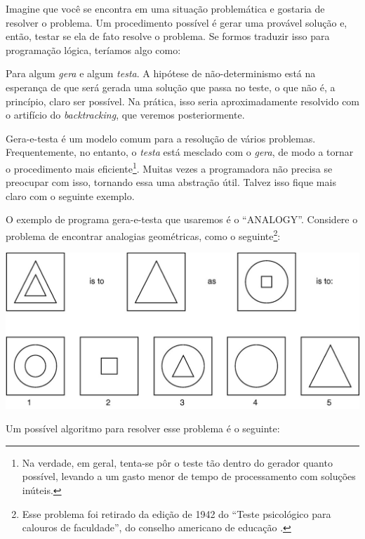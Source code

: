 \documentclass{article}
\theoremstyle{remark}
\theoremstyle{theorem}
\begin{document}
  Imagine que você se encontra em uma situação problemática e gostaria de resolver o problema. Um procedimento possível é gerar uma provável solução e, então, testar se ela de fato resolve o problema. Se formos traduzir isso para programação lógica, teríamos algo como:



Para algum \textit{gera} e algum \textit{testa}. A hipótese de não-determinismo está na esperança de que será gerada uma solução que passa no teste, o que não é, a princípio, claro ser possível. Na prática, isso seria aproximadamente resolvido com o artifício do \textit{backtracking}, que veremos posteriormente.

Gera-e-testa é um modelo comum para a resolução de vários problemas. Frequentemente, no entanto, o \textit{testa} está mesclado com o \textit{gera}, de modo a tornar o procedimento mais eficiente\footnote{Na verdade, em geral, tenta-se pôr o teste tão dentro do gerador quanto possível, levando a um gasto menor de tempo de processamento com soluções inúteis.}. Muitas vezes a programadora não precisa se preocupar com isso, tornando essa uma abstração útil. Talvez isso fique mais claro com o seguinte exemplo.

O exemplo de programa gera-e-testa que usaremos é o ``ANALOGY''. Considere o problema de encontrar analogias geométricas, como o seguinte\footnote{Esse problema foi retirado da edição de 1942 do ``Teste psicológico para calouros de faculdade'', do conselho americano de educação \cite{evans}.}:\vspace{1cm}

\includegraphics[width=\linewidth]{analogy}

\vspace{1cm}Um possível algoritmo para resolver esse problema é o seguinte:
\end{document}
